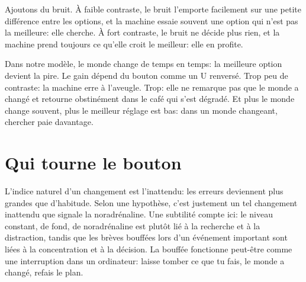 Ajoutons du bruit. À faible contraste, le bruit l'emporte facilement sur une petite différence entre les options, et la machine essaie souvent une option qui n'est pas la meilleure: elle cherche. À fort contraste, le bruit ne décide plus rien, et la machine prend toujours ce qu'elle croit le meilleur: elle en profite.

Dans notre modèle, le monde change de temps en temps: la meilleure option devient la pire. Le gain dépend du bouton comme un U renversé. Trop peu de contraste: la machine erre à l'aveugle. Trop: elle ne remarque pas que le monde a changé et retourne obstinément dans le café qui s'est dégradé. Et plus le monde change souvent, plus le meilleur réglage est bas: dans un monde changeant, chercher paie davantage.


\section*{Qui tourne le bouton}

L'indice naturel d'un changement est l'inattendu: les erreurs deviennent plus grandes que d'habitude. Selon une hypothèse, c'est justement un tel changement inattendu que signale la noradrénaline. Une subtilité compte ici: le niveau constant, de fond, de noradrénaline est plutôt lié à la recherche et à la distraction, tandis que les brèves bouffées lors d'un événement important sont liées à la concentration et à la décision. La bouffée fonctionne peut-être comme une interruption dans un ordinateur: \og laisse tomber ce que tu fais, le monde a changé, refais le plan\fg{}.


